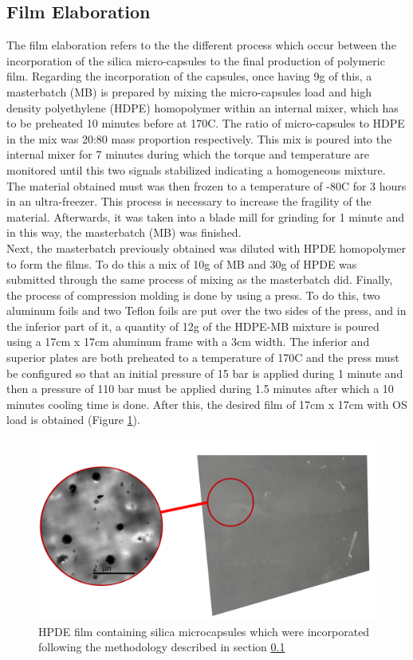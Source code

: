\begin{refsection}
\subsection{Film Elaboration} \label{sec:film_elaboration}
The film elaboration refers to the the different process which occur between the incorporation of the silica micro-capsules to the final production of polymeric film. Regarding the incorporation of the capsules, once having 9g of this, a masterbatch (MB) is prepared by mixing the micro-capsules load and high density polyethylene (HDPE) homopolymer within an internal mixer, which has to be preheated 10 minutes before at 170\degree C. The ratio of  micro-capsules to HDPE in the mix was 20:80 mass proportion respectively. This mix is poured into the internal mixer for 7 minutes during which the torque and temperature are monitored until this two signals stabilized indicating a homogeneous mixture. The material obtained must was then frozen to a temperature of -80\degree C for 3 hours in an ultra-freezer. This process is necessary to increase the fragility of the material. Afterwards, it was taken into a blade mill for grinding for 1 minute and in this way, the masterbatch (MB) was finished. \\

Next, the masterbatch previously obtained was diluted with HPDE homopolymer to form the films. To do this a mix of 10g of MB and 30g of HPDE was submitted through the same process of mixing as the masterbatch did. Finally, the process of compression molding is done by using a press. To do this, two aluminum foils and two Teflon foils are put over the two sides of the press, and in the inferior part of it, a quantity of 12g of the HDPE-MB mixture is poured using a 17cm x 17cm aluminum frame with a 3cm width. The inferior and superior plates are both preheated to a temperature of 170\degree C and the press must be configured so that an initial pressure of 15 bar is applied during 1 minute and then a pressure of 110 bar must be applied during 1.5 minutes after which a 10 minutes cooling time is done. After this, the desired film of 17cm x 17cm with OS load is obtained (Figure \ref{fig:film}).

\begin{figure}[ht]
    \centering
    \includegraphics[width=0.6\linewidth]{Imagenes/pelicula.png}
    \caption{HPDE film containing silica microcapsules which were incorporated following the methodology described in section \ref{sec:film_elaboration} \cite{ArellanoAyala2019EfectosAntioxidantes}}
    \label{fig:film}
\end{figure}


\end{refsection}
